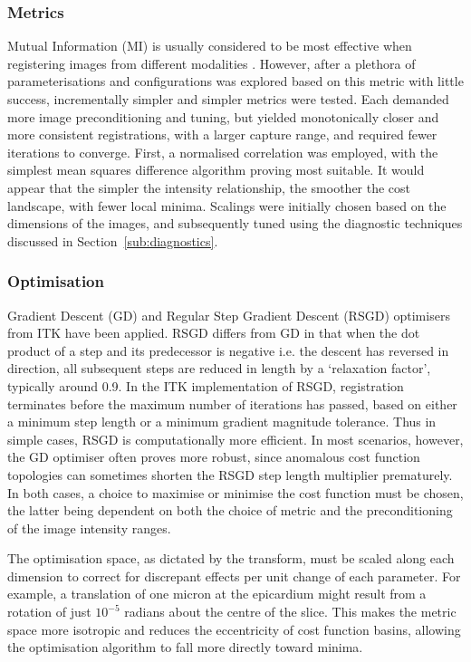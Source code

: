     \subsubsection{Metrics} %
    \label{ssub:metrics}
      Mutual Information (MI) is usually considered to be most effective when registering images from different modalities \cite{Wells1996}. However, after a plethora of parameterisations and configurations was explored based on this metric with little success, incrementally simpler and simpler metrics were tested. Each demanded more image preconditioning and tuning, but yielded monotonically closer and more consistent registrations, with a larger capture range, and required fewer iterations to converge. First, a normalised correlation was employed, with the simplest mean squares difference algorithm proving most suitable. It would appear that the simpler the intensity relationship, the smoother the cost landscape, with fewer local minima. Scalings were initially chosen based on the dimensions of the images, and subsequently tuned using the diagnostic techniques discussed in Section~\ref{sub:diagnostics}.
  
    \subsubsection{Optimisation} %
    \label{ssub:optimisation}
      Gradient Descent (GD) and Regular Step Gradient Descent (RSGD) optimisers from ITK have been applied. RSGD differs from GD in that when the dot product of a step and its predecessor is negative i.e. the descent has reversed in direction, all subsequent steps are reduced in length by a `relaxation factor', typically around 0.9. In the ITK implementation of RSGD, registration terminates before the maximum number of iterations has passed, based on either a minimum step length or a minimum gradient magnitude tolerance. Thus in simple cases, RSGD is computationally more efficient. In most scenarios, however, the GD optimiser often proves more robust, since anomalous cost function topologies can sometimes shorten the RSGD step length multiplier prematurely. In both cases, a choice to maximise or minimise the cost function must be chosen, the latter being dependent on both the choice of metric and the preconditioning of the image intensity ranges.

      The optimisation space, as dictated by the transform, must be scaled along each dimension to correct for discrepant effects per unit change of each parameter. For example, a translation of one micron at the epicardium might result from a rotation of just $10^{-5}$ radians about the centre of the slice. This makes the metric space more isotropic and reduces the eccentricity of cost function basins, allowing the optimisation algorithm to fall more directly toward minima.
    
